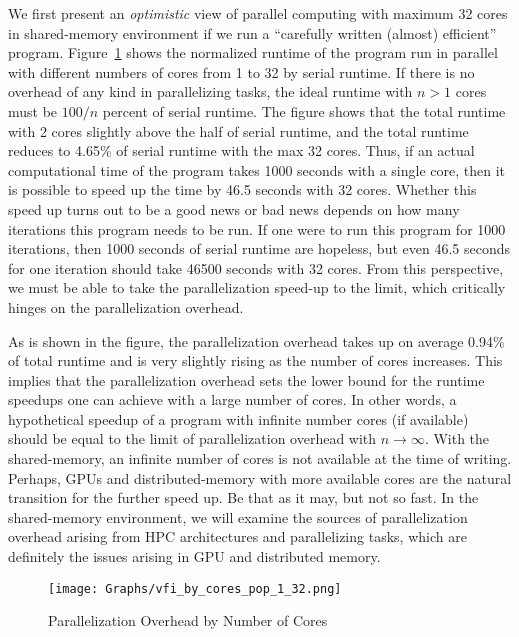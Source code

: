 \documentclass[12pt]{article}
\begin{document}
We first present an \textit{optimistic} view of parallel computing with maximum 32 cores in shared-memory environment if we run a ``carefully written (almost) efficient'' program. Figure~\ref{fig:runtime_cores_pop_1_32} shows the normalized runtime of the program run in parallel with different numbers of cores from 1 to 32 by serial runtime. If there is no overhead of any kind in parallelizing tasks, the ideal runtime with $n>1$ cores must be $100/n$ percent of serial runtime. The figure shows that the total runtime with 2 cores slightly above the half of serial runtime, and the total runtime reduces to 4.65\% of serial runtime with the max 32 cores. Thus, if an actual computational time of the program takes 1000 seconds with a single core, then it is possible to speed up the time by 46.5 seconds with 32 cores. Whether this speed up turns out to be a good news or bad news depends on how many iterations this program needs to be run. If one were to run this program for 1000 iterations, then 1000 seconds of serial runtime are hopeless, but even 46.5 seconds for one iteration should take 46500 seconds with 32 cores. From this perspective, we must be able to take the parallelization speed-up to the limit, which critically hinges on the parallelization overhead.

As is shown in the figure, the parallelization overhead takes up on average 0.94\% of total runtime and is very slightly rising as the number of cores increases. This implies that the parallelization overhead sets the lower bound for the runtime speedups one can achieve with a large number of cores. In other words, a hypothetical speedup of a program with infinite number cores (if available) should be equal to the limit of parallelization overhead with $n\rightarrow\infty$. With the shared-memory, an infinite number of cores is not available at the time of writing. Perhaps, GPUs and distributed-memory with more available cores are the natural transition for the further speed up. Be that as it may, but not so fast. In the shared-memory environment, we will examine the sources of parallelization overhead arising from HPC architectures and parallelizing tasks, which are definitely the issues arising in GPU and distributed memory.
\begin{figure}[t!]
\sf
\begin{center}
\caption{\sf Parallelization Overhead by Number of Cores}
\texttt{[image: Graphs/vfi\_by\_cores\_pop\_1\_32.png]}\label{fig:runtime_cores_pop_1_32}
\end{center}
\end{figure}
\end{document}
